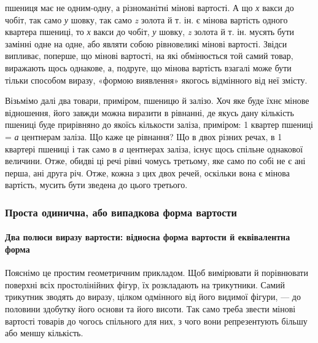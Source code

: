 \parcont{}  %
пшениця має не одним-одну, а різноманітні мінові вартості.
А що \emph{х} вакси до чобіт, так само \emph{у} шовку, так само \emph{z} золота
й т. ін. є мінова вартість одного квартера пшениці, то \emph{х} вакси до чобіт,
\emph{у} шовку, \emph{z} золота й т. ін. мусять бути замінні одне на одне, або
являти собою рівновеликі мінові вартості. Звідси випливає, поперше,
що мінові вартості, на які обмінюється той самий товар,
виражають щось однакове, а, подруге, що мінова вартість взагалі
може бути тільки способом виразу, «формою виявлення» якогось
відмінного від неї змісту.

Візьмімо далі два товари, приміром, пшеницю й залізо. Хоч
яке буде їхнє мінове відношення, його завжди можна виразити
в рівнанні, де якусь дану кількість пшениці буде прирівняно до
якоїсь кількости заліза, приміром: 1 квартер пшениці = \emph{а} центнерам
заліза. Що каже це рівнання? Що в двох різних речах,
в 1 квартері пшениці і так само в \emph{а} центнерах заліза, існує щось
спільне однакової величини. Отже, обидві ці речі рівні чомусь
третьому, яке само по собі не є ані перша, ані друга річ. Отже,
кожна з цих двох речей, оскільки вона є мінова вартість, мусить
бути зведена до цього третього.

\subsubsection{Проста одинична, або випадкова форма вартости}
\paragraph{Два полюси виразу вартости: відносна форма вартости
й еквівалентна форма}

Пояснімо це простим геометричним прикладом. Щоб вимірювати
й порівнювати поверхні всіх простолінійних фігур, їх розкладають
на трикутники. Самий трикутник зводять до виразу,
цілком одмінного від його видимої фігури, — до половини здобутку
його основи та його висоти. Так само треба звести мінові
вартості товарів до чогось спільного для них, з чого вони репрезентують
більшу або меншу кількість.

